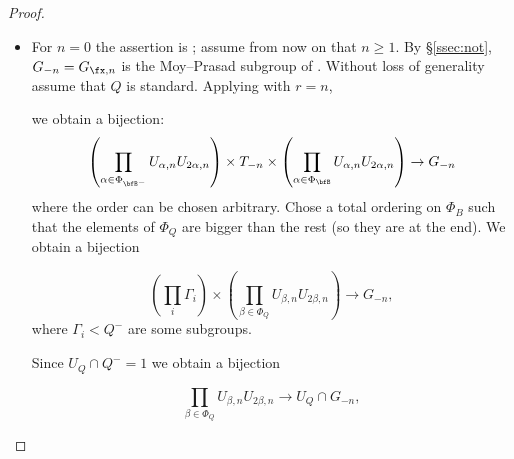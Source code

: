\documentclass[12pt,a4paper]{amsart}%
\newcommand{\RamiF}[1]{{{#1}}}
\begin{document}
\begin{proof}
$ $
\begin{itemize}
    \item [\eqref{lem:U.filtration:1}]
 For $n=0$ the assertion is ; assume from now on that $n\geq1$. By \S\ref{ssec:not}, $G_{-n}=G_{\fx,n}$ is the Moy--Prasad subgroup
of \cite[Definition 13.2.1]{KP}. 
\RamiF{Without loss of generality assume that $Q$ is standard.}
Applying
\cite[Proposition 13.2.5(3)]{KP} with $r=n$, 
\RamiF{we obtain a bijection:
$$\left(\prod_{\alpha\in \Phi_{\bfB^-}}U_{\alpha,n}U_{2\alpha,n} \right)\times T_{-n} \times \left(\prod_{\alpha\in\Phi_{\bfB}}U_{\alpha,n}U_{2\alpha,n} \right)\to G_{-n}$$
where the order can be chosen arbitrary.
Chose a total ordering on $\Phi_B$ such that the elements of $\Phi_Q$ are bigger than the rest (so they are at the end). We obtain a bijection

$$\left(\prod_{i}\Gamma_i\right)\times 
\left(\prod_{\beta\in\Phi_Q}U_{\beta,n}U_{2\beta,n} \right)\to G_{-n},$$
where $\Gamma_i<Q^-$ are some subgroups.

Since $U_Q\cap Q^-=1$ we obtain a bijection
}

\RamiF{
}
\begin{equation}\label{eq:U.filtration.exact}
\RamiF{\prod_{\beta\in\Phi_Q}U_{\beta,n}U_{2\beta,n}
\to
U_Q\cap G_{-n},}
\end{equation}


\end{itemize}
\end{proof}
\end{document}
